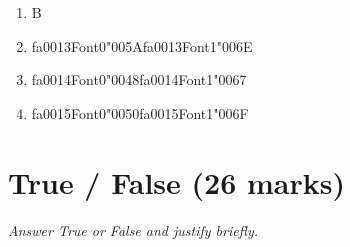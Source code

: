 \documentclass[12pt]{article}
\begin{document}
\begin{enumerate}[label=\arabic*.]
\begin{enumerate}[label=(\alph*)]
    \item B
    \item {\csname fa0013Font0\endcsname\char"005A}{\csname fa0013Font1\endcsname\char"006E}
    \item {\csname fa0014Font0\endcsname\char"0048}{\csname fa0014Font1\endcsname\char"0067}
    \item {\csname fa0015Font0\endcsname\char"0050}{\csname fa0015Font1\endcsname\char"006F}
\end{enumerate}
\end{enumerate}

\section*{True / False (26 marks)}
\textit{Answer True or False and justify briefly.}
\end{document}

